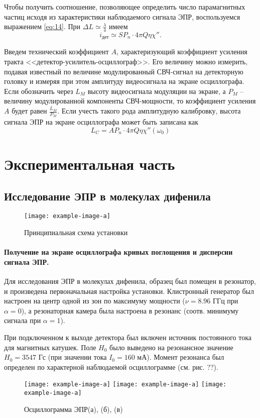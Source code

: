 Чтобы получить соотношение, позволяющее определить число  парамагнитных частиц исходя из характеристики наблюдаемого сигнала ЭПР, воспользуемся выражением \eqref{eq:14}. При $\Delta L \simeq \frac{\lambda}{4}$ имеем
\begin{equation}
    \label{eq:15}
    i_{\text{дет}} \simeq S P_n \cdot 4 \pi Q \eta \chi''.
\end{equation}

Введем технический коэффициент $A$, характеризующий коэффициент усиления тракта <<детектор-усилитель-осциллограф>>. Его величину можно измерить, подавая известный по величине модулированный СВЧ-сигнал на детекторную головку и измеряя при этом амплитуду видеосигнала на экране осциллографа. Если обозначить через  $L_M$ высоту видеосигнала модуляции 
на экране, а $P_M$ -- величину модулированной компоненты СВЧ-мощности, то коэффициент усиления $A$ будет равен  $\frac{L_M}{P_M}$. Если учесть такого рода амплитудную калибровку, высота сигнала ЭПР на экране осциллографа может быть записана как
\begin{equation}
    \label{eq:16}
    L_{C} = A P_n \cdot 4 \pi Q \eta \chi''(\omega_{0})
\end{equation}
\section{Экспериментальная часть}%


\subsection{Исследование ЭПР в молекулах дифенила}%
\begin{figure}[h!]
    \centering
    \texttt{[image: example-image-a]}
    \caption{Принципиальная схема установки}
    \label{fig:1}
\end{figure}
\paragraph{Получение на экране осциллографа кривых поглощения и дисперсии сигнала ЭПР.}%
\label{par:1}
Для исследования ЭПР в молекулах дифенила, образец был помещен в резонатор, и произведена первоначальная настройка
установки. Клистронный генератор был настроен на центр одной из зон по максимуму мощности ($\nu = 8.96$ ГГц при $\alpha = 0$), а
резонаторная камера была настроена в резонанс (соотв. минимуму сигнала при $\alpha = 1$).

При подключенном к выходе детектора был включен источник постоянного тока для магнитных катушек. Поле $H_0$ было выведено на
резонансное значение $H_0 = 3547$ Гс (при значении тока $I_0 = 160$ мА). Момент резонанса был определен по характерной
наблюдаемой осциллограмме (см. рис. ??).
\begin{figure}[h!]
    \centering
    \texttt{[image: example-image-a]}
    \texttt{[image: example-image-a]}
    \texttt{[image: example-image-a]}
    \caption{Осциллограмма ЭПР(а), (б), (в)}
    \label{fig:2}
\end{figure}

